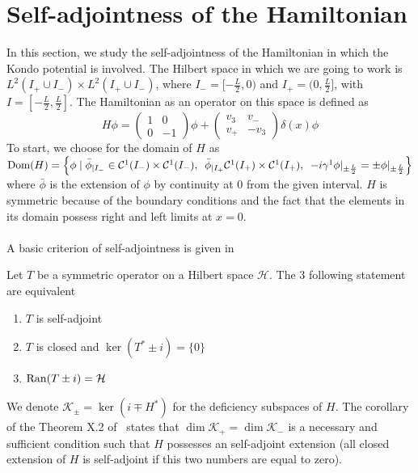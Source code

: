 \section{Self-adjointness of the Hamiltonian}
In this section, we study the self-adjointness of the Hamiltonian in which the Kondo potential is involved. The Hilbert space in which we are going to work is $L^{2}(I_+ \cup I_-) \times L^{2}(I_+ \cup I_-)$,  where $I_- = [-\frac{L}{2}, 0)$ and $I_+ = (0, \frac{L}{2}]$, with $I = [-\frac{L}{2}, \frac{L}{2}]$. The Hamiltonian as an operator on this space is defined as
\begin{equation}
H \phi = \begin{pmatrix}
1  &  0 \\
0  &  -1  \end{pmatrix} \phi + \begin{pmatrix}
v_3  &  v_-  \\
v_+  &  -v_3  \end{pmatrix} \delta(x) \phi
\end{equation}
To start, we choose for the domain of $H$ as $\mathrm{Dom}(H) = \Big \{\phi  \mid \bar{\phi}_{| I_-} \in \mathcal{C}^1(I_-) \times \mathcal{C}^1(I_-), \enskip \bar{\phi}_{| I_+}\mathcal{C}^1(I_+) \times \mathcal{C}^1(I_+), \enskip -i \gamma^1 \phi\vert_{\pm \frac{L}{2}} = \pm \phi \vert_{ \pm \frac{L}{2} } \Big \}$ where $\bar{\phi}$ is the extension of $\phi$ by continuity at 0 from the given interval. $H$ is symmetric because of the boundary conditions and the fact that the elements in its domain possess right and left limits at $x=0$.\\\\
A basic criterion of self-adjointness is given in~\cite{Reed1981}
\begin{theorem}
Let $T$ be a symmetric operator on a Hilbert space $ \mathcal{H}$. The 3 following statement are equivalent 
\begin{enumerate}
\item $T$ is self-adjoint
\item $T$ is closed and $\ker(T^* \pm i) = \{0\}$
\item $\mathrm{Ran}(T \pm i ) = \mathcal{H}$
\end{enumerate} 
\end{theorem}
We denote  $\mathcal{K}_{\pm} = \ker (i \mp H^*)$ for the deficiency subspaces of $H$. The corollary of the Theorem X.2 of~\cite{Reed1975} states that $\dim \mathcal{K}_+ = \dim \mathcal{K}_-$ is a necessary and sufficient condition such that $H$ possesses an self-adjoint extension (all closed extension of $H$ is self-adjoint if this two numbers are equal to zero). \\
